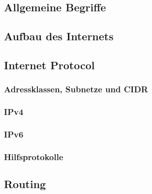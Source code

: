 \documentclass[a4paper,10pt]{scrartcl}
\begin{document}
\subsection{Allgemeine Begriffe}
\subsection{Aufbau des Internets}
\subsection{Internet Protocol}
\subsubsection{Adressklassen, Subnetze und CIDR}
\subsubsection{IPv4}
\subsubsection{IPv6}
\subsubsection{Hilfsprotokolle}
\subsection{Routing}
\end{document}
